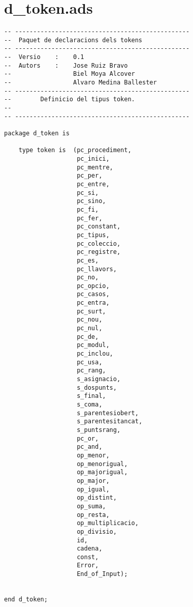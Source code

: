 \documentclass[10pt]{report}
\begin{document}
    \section{d\_token.ads}
    \begin{lstlisting}[style=Ada]
-- ------------------------------------------------
--  Paquet de declaracions dels tokens
-- ------------------------------------------------
--  Versio    :    0.1
--  Autors    :    Jose Ruiz Bravo
--                 Biel Moya Alcover
--                 Alvaro Medina Ballester
-- ------------------------------------------------
--        Definicio del tipus token.
--
-- ------------------------------------------------

package d_token is

    type token is  (pc_procediment,
                    pc_inici,
                    pc_mentre,
                    pc_per,
                    pc_entre,
                    pc_si,
                    pc_sino,
                    pc_fi,
                    pc_fer,
                    pc_constant,
                    pc_tipus,
                    pc_coleccio,
                    pc_registre,
                    pc_es,
                    pc_llavors,
                    pc_no,
                    pc_opcio,
                    pc_casos,
                    pc_entra,
                    pc_surt,
                    pc_nou,
                    pc_nul,
                    pc_de,
                    pc_modul,
                    pc_inclou,
                    pc_usa,
                    pc_rang,
                    s_asignacio,
                    s_dospunts,
                    s_final,
                    s_coma,
                    s_parentesiobert,
                    s_parentesitancat,
                    s_puntsrang,
                    pc_or,
                    pc_and,
                    op_menor,
                    op_menorigual,
                    op_majorigual,
                    op_major,
                    op_igual,
                    op_distint,
                    op_suma,
                    op_resta,
                    op_multiplicacio,
                    op_divisio,
                    id,
                    cadena,
                    const,
                    Error,
                    End_of_Input);
            
                    
end d_token;
    \end{lstlisting}
    \newpage
    
    
\end{document}
